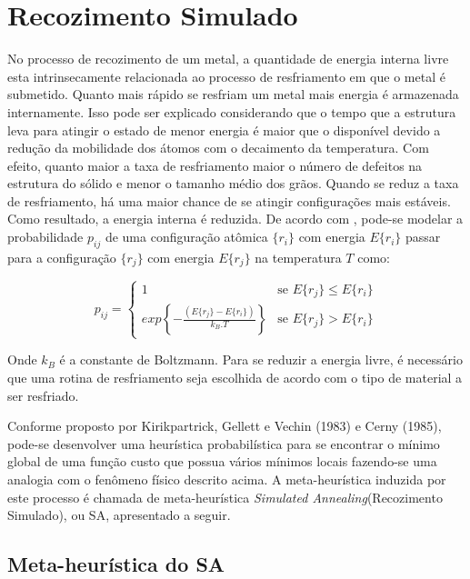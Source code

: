 \section{Recozimento Simulado}

No processo de recozimento de um metal, a quantidade de energia interna livre esta intrinsecamente
relacionada ao processo de resfriamento em que o metal é submetido. Quanto mais rápido se
resfriam um metal mais energia é armazenada internamente. Isso pode ser explicado considerando que
o tempo que a estrutura leva para atingir o estado de menor energia é maior que o disponível devido
a redução da mobilidade dos átomos com o decaimento da temperatura. Com efeito, quanto maior a taxa de
resfriamento maior o número de defeitos na estrutura do sólido e menor o tamanho médio dos grãos.
Quando se reduz a taxa de resfriamento, há uma maior chance de se atingir configurações mais estáveis.
Como resultado, a energia interna é reduzida. De acordo com \cite{bertsimas1993simulated},
pode-se modelar a probabilidade $p_{ij}$ de uma configuração atômica $\{r_i\}$ com energia $E\{r_i\}$
passar para a configuração $\{r_j\}$ com energia $E\{r_j\}$ na temperatura $T$ como:

\begin{equation}
\mbox{$p_{ij}$}=\left\{
	\begin{array}{rl}
	1 & \mbox{se $E\{r_j\} \le E\{r_i\}$} \\
	exp\left\{-\frac{(E\{r_j\}-E\{r_i\})}{k_B.T}\right\} & \mbox{se $E\{r_j\} > E\{r_i\}$}
\end{array} \right.
\end{equation}

Onde $k_B$ é a constante de Boltzmann. Para se reduzir a energia livre, é necessário que uma
rotina de resfriamento seja escolhida de acordo com o tipo de material a ser resfriado.

Conforme proposto por Kirikpartrick, Gellett e Vechin (1983) e Cerny (1985), pode-se desenvolver
uma heurística probabilística para se encontrar o mínimo global de uma função custo que possua
vários mínimos locais fazendo-se uma analogia com o fenômeno físico descrito acima. A meta-heurística
induzida por este processo é chamada de meta-heurística \textit{Simulated Annealing}(Recozimento
Simulado), ou SA, apresentado a seguir.

\subsection{Meta-heurística do SA}

